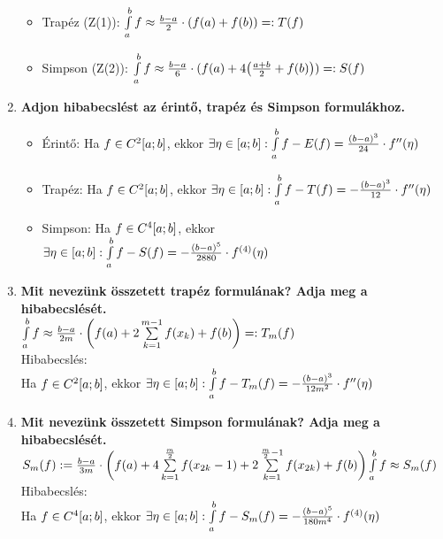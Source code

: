 \documentclass{article}
\begin{document}
\begin{enumerate}
\begin{itemize}
		\item Trapéz (Z(1)): $\int\limits_{a}^{b} f\approx\frac{b-a}{2}\cdot(f(a)+f(b))=:T(f)$
		\item Simpson (Z(2)): $\int\limits_{a}^{b} f\approx\frac{b-a}{6}\cdot(f(a)+4\big(
		\frac{a+b}{2}+f(b)\big))=:S(f)$
	\end{itemize}
	\item\textbf{Adjon hibabecslést az érintő, trapéz és Simpson formulákhoz.}
	\begin{itemize}
		\item Érintő: Ha $f\in C^2[a;b]$, ekkor $\exists\eta\in[a;b]:\int\limits_{a}^{b} f-E(f)=
		\frac{(b-a)^3}{24}\cdot f''(\eta)$
		\item Trapéz: Ha $f\in C^2[a;b]$, ekkor $\exists\eta\in[a;b]:\int\limits_{a}^{b} f-T(f)=
		-\frac{(b-a)^3}{12}\cdot f''(\eta)$
		\item Simpson: Ha $f\in C^4[a;b]$, ekkor $\exists\eta\in[a;b]:\int\limits_{a}^{b} f-S(f)=
		-\frac{(b-a)^5}{2880}\cdot f^{(4)}(\eta)$
	\end{itemize}
	\item\textbf{Mit nevezünk összetett trapéz formulának? Adja meg a hibabecslését.}\\[0.1cm]
	$\int\limits_{a}^{b} f\approx\frac{b-a}{2m}\cdot\bigg(f(a)+2\sum\limits_{k=1}^{m-1}
	f(x_k)+f(b)\bigg)=:T_m(f)$\\[0.3cm]Hibabecslés:\\[0.1cm]
	{\Large Ha $f\in C^2[a;b]$, ekkor $\exists\eta\in[a;b]:\int\limits_{a}^{b} f-T_m(f)=-\frac{(b-a)^3}{12m^2}\cdot f''(\eta)$}
	\newpage
	\item\textbf{Mit nevezünk összetett Simpson formulának? Adja meg a hibabecslését.}\\[0.1cm]
	$S_m(f):=\frac{b-a}{3m}\cdot\bigg(f(a)+4\sum\limits_{k=1}^{\frac{m}{2}}
	f(x_{2k}-1)+2\sum\limits_{k=1}^{\frac{m}{2}-1}f(x_{2k})+f(b)\bigg)\\[0.1cm]
	\int\limits_{a}^{b} f\approx S_m(f)$\\[0.3cm]Hibabecslés:\\[0.1cm]
	{\Large Ha $f\in C^4[a;b]$, ekkor $\exists\eta\in[a;b]:\int\limits_{a}^{b} f-S_m(f)=
	-\frac{(b-a)^5}{180m^4}\cdot f^{(4)}(\eta)$}
\end{enumerate}
\end{document}
